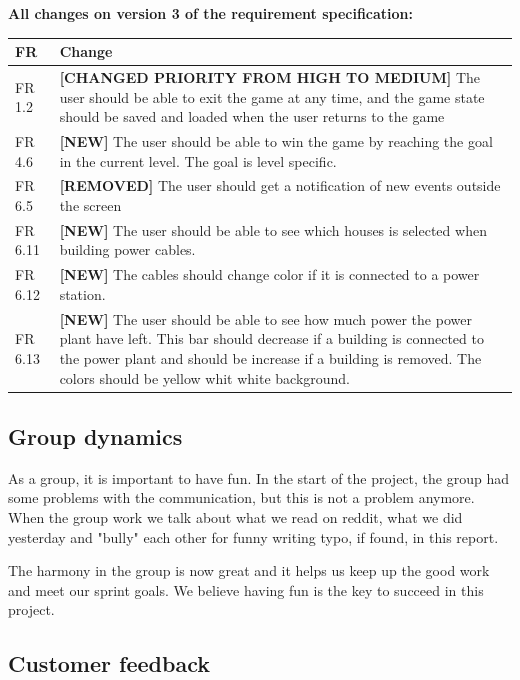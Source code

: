 	{\bf All changes on version 3 of the requirement specification:} \\
	\begin{tabular}{| p{1.5cm} | p{12cm} |}
		\hline
		\rowcolor{lightgray}
		{\bf FR} & {\bf Change} \\ \hline
		FR 1.2 & {\bf \color{orange}[CHANGED PRIORITY FROM HIGH TO MEDIUM]} The user should be able 
		to exit the game at any time, and the game state should be saved and loaded when the user 
		returns to the game \\ \hline
		FR 4.6 & {\bf \color{green}[NEW]} The user should be able to win the game by reaching the goal in the current level. The goal is level specific. \\ \hline
		FR 6.5 & {\bf \color{red}[REMOVED]} The user should get a notification of new events outside 
		the screen \\ \hline
		FR 6.11 & {\bf \color{green}[NEW]} The user should be able to see which houses is selected when building power cables. \\ \hline
		FR 6.12 & {\bf \color{green}[NEW]} The cables should change color if it is connected to a power 
		station. \\ \hline
		FR 6.13 & {\bf \color{green}[NEW]} The user should be able to see how much power the 
		power plant have left. This bar should decrease if a building is connected to the power plant 
		and should be increase if a building is removed. The colors should be yellow whit white 
		background. \\ \hline
	\end{tabular}


\subsection{Group dynamics}
	As a group, it is important to have fun. In the start of the project, the group had some
	problems with the communication, but this is not a problem anymore.
	When the group work we talk about what we read on reddit, what we did yesterday and 
	"bully" each other for funny writing typo, if found, in this report. 

	The harmony in the group is now great and it helps us keep up the good work and meet 
	our sprint goals. We believe having fun is the key to succeed in this project. 

\subsection{Customer feedback}

